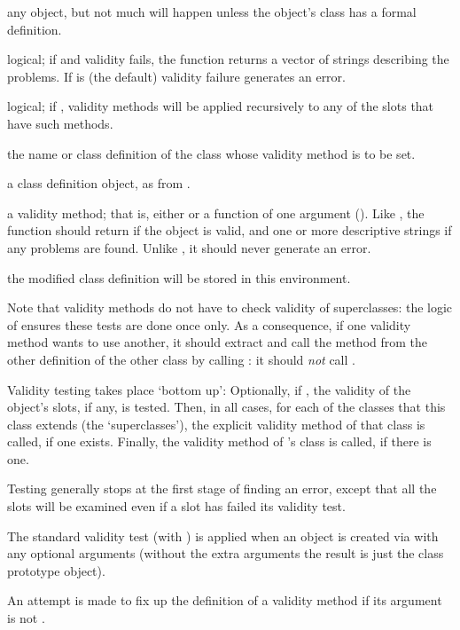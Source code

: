 \begin{Arguments}
\begin{ldescription}
\item[\code{object}]  any object, but not much will happen unless the
object's class has a formal definition.
\item[\code{test}] logical; if  and validity fails, the
function returns a vector of strings describing the problems.  If
 is  (the default) validity failure generates
an error.
\item[\code{complete}] logical; if , validity methods will be
applied recursively to any of the slots that have such methods.
\item[\code{Class}] the name or class definition of the class whose validity
method is to be set.
\item[\code{ClassDef}] a class definition object, as from
.
\item[\code{method}] a validity method;  that is, either  or a
function of one argument ().  Like
, the function should return  if the
object is valid, and one or more descriptive strings if any problems
are found.  Unlike , it should never generate an
error.

\item[\code{where}] the modified class definition will be stored in this
environment.

Note that validity methods do not have to check validity of
superclasses: the logic of  ensures these tests are
done once only.  As a consequence, if one validity method wants to use
another, it should extract and call the method from the other
definition of the other class by calling : it
should \emph{not} call .
\end{ldescription}
\end{Arguments}
%
\begin{Details}\relax
Validity testing takes place `bottom up': Optionally, if
, the validity of the object's slots, if any, is
tested.  Then, in all cases, for each of the classes that this class
extends (the `superclasses'), the explicit validity method of
that class is called, if one exists.  Finally, the validity method of
's class is called, if there is one.

Testing generally stops at the first stage of finding an error, except
that all the slots will be examined even if a slot has failed its
validity test.

The standard validity test (with ) is applied
when an object is created via  with any optional
arguments (without the extra arguments the result is just the class
prototype object).

An attempt is made to fix up the definition of a validity method if
its argument is not .
\end{Details}
